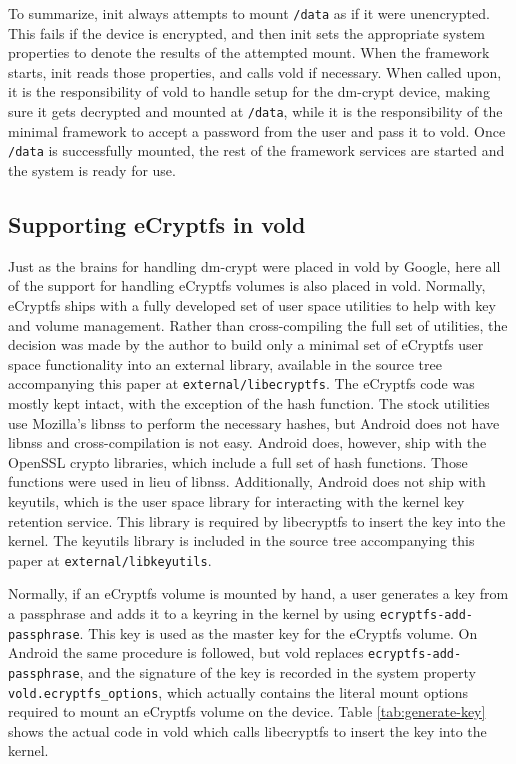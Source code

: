 To summarize, init always attempts to mount \texttt{/data} as if it were unencrypted. This fails if the device is encrypted, and
then init sets the appropriate system properties to denote the results of the attempted mount. When the framework starts, init reads
those properties, and calls vold if necessary. When called upon, it is the responsibility of vold to handle setup
for the dm-crypt device, making sure it gets decrypted and mounted at \texttt{/data}, while it is the responsibility of the
minimal framework to accept a password from the user and pass it to vold. Once \texttt{/data} is successfully mounted, the
rest of the framework services are started and the system is ready for use.

\subsection{Supporting eCryptfs in vold} \label{sec:ecryptfsvold} Just as the brains for handling dm-crypt were placed in vold by
Google, here all of the support for handling eCryptfs volumes is also placed in vold. Normally, eCryptfs ships with a fully
developed set of user space utilities to help with key and volume management. Rather than cross-compiling the full set of utilities,
the decision was made by the author to build only a minimal set of eCryptfs user space functionality into an external library,
available in the source tree accompanying this paper at \texttt{external/libecryptfs}.  The eCryptfs code was mostly kept intact,
with the exception of the hash function. The stock utilities use Mozilla's libnss to perform the necessary hashes, but Android does
not have libnss and cross-compilation is not easy. Android does, however, ship with the OpenSSL crypto libraries, which include a
full set of hash functions. Those functions were used in lieu of libnss.  Additionally, Android does not ship with keyutils, which
is the user space library for interacting with the kernel key retention service.  This library is required by libecryptfs to insert
the key into the kernel. The keyutils library is included in the source tree accompanying this paper at
\texttt{external/libkeyutils}. 

Normally, if an eCryptfs volume is mounted by hand, a user generates a key from a passphrase and adds it to a keyring in the kernel
by using \texttt{ecryptfs-add-passphrase}.  This key is used as the master key for the eCryptfs volume. On Android the same
procedure is followed, but vold replaces \texttt{ecryptfs-add-passphrase}, and the signature of the key is recorded in the system
property \texttt{vold.ecryptfs\_options}, which actually contains the literal mount options required to mount an eCryptfs volume on
the device. Table \ref{tab:generate-key} shows the actual code in vold which calls libecryptfs to insert the key into the kernel. 

